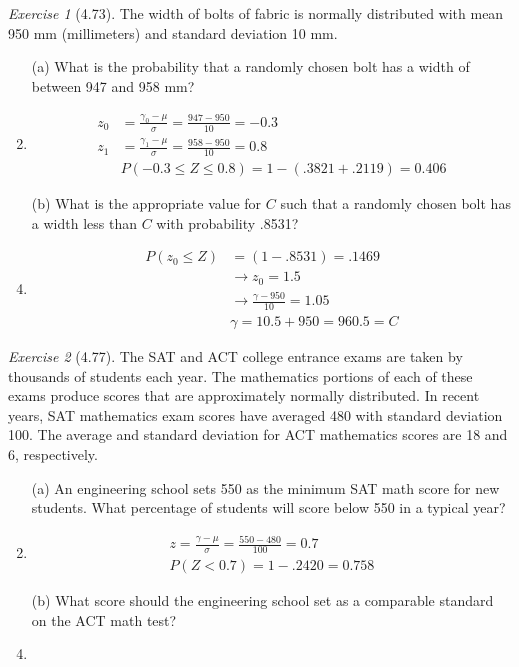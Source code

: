 \documentclass[12pt]{amsart}
\makeatletter
\theoremstyle{remark}
\newtheorem*{exercise}{Exercise}%
\renewenvironment{proof}[1][\proofname]{\par\doublespacing
  \pushQED{\qed}%
  \normalfont \topsep6\p@\@plus6\p@\relax
  \list{}{%
    \settowidth{\leftmargin}{\itshape\proofname:\hskip\labelsep}%
    \setlength{\labelwidth}{0pt}%
    \setlength{\itemindent}{-\leftmargin}%
  }%
  \item[\hskip\labelsep\itshape#1\@addpunct{:}]\ignorespaces
}{%
  \popQED\endlist\@endpefalse
  \singlespacing
}
\theoremstyle{mycomment}
\makeatother
\begin{document}
\begin{exercise}[4.73]
The width of bolts of fabric is normally distributed with mean 950 mm (millimeters) and standard deviation 10 mm.

\begin{enumerate}
    \item[(a)] What is the probability that a randomly chosen bolt has a width of between 947 and 958 mm?
\begin{proof}[Solution]
  \begin{align*}
    z_0 &= \frac{\gamma_0 - \mu}{\sigma} = \frac{947 - 950}{10} = -0.3 \\
    z_1 &= \frac{\gamma_1 - \mu}{\sigma} = \frac{958 - 950}{10} = 0.8  \\
        &  P(-0.3 \leq Z \leq 0.8) = 1 - (.3821 + .2119) = 0.406
  \end{align*}
\end{proof}
    \item[(b)] What is the appropriate value for $C$ such that a randomly chosen bolt has a width less than $C$ with probability .8531?
\begin{proof}[Solution]
  \begin{align*}
    P(z_0 \leq Z) & = (1-.8531) = .1469 \\
                  & \to z_0 = 1.5 \\
                  & \to \frac{\gamma - 950}{10} = 1.05 \\
                  & \gamma = 10.5 + 950 = 960.5 = C
  \end{align*}
\end{proof}
\end{enumerate}
\end{exercise}

\begin{exercise}[4.77]
The SAT and ACT college entrance exams are taken by thousands of students each year. The mathematics portions of each of these exams produce scores that are approximately normally distributed. In recent years, SAT mathematics exam scores have averaged 480 with standard deviation 100. The average and standard deviation for ACT mathematics scores are 18 and 6, respectively.

\begin{enumerate}
    \item[(a)] An engineering school sets 550 as the minimum SAT math score for new students. What percentage of students will score below 550 in a typical year?
\begin{proof}[Solution]
  \begin{align*}
    z = \frac{\gamma - \mu}{\sigma} = \frac{550 - 480}{100} = 0.7 \\
    P(Z < 0.7) = 1 - .2420 = 0.758 
  \end{align*}
\end{proof}
    \item[(b)] What score should the engineering school set as a comparable standard on the ACT math test?
\begin{proof}[Solution]
 
\end{proof}
\end{enumerate}
\end{exercise}
\end{document}
